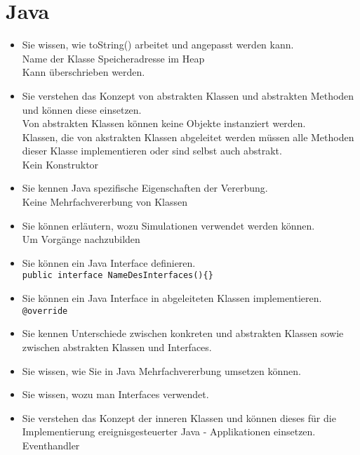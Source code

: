 \section{Java}
\begin{itemize}
  \item Sie wissen, wie toString() arbeitet und angepasst werden kann. \\
        Name der Klasse \@ Speicheradresse im Heap \\
        Kann überschrieben werden. 
  \item Sie verstehen das Konzept von abstrakten Klassen und abstrakten Methoden und können diese einsetzen. \\
        Von abstrakten Klassen können keine Objekte instanziert werden. \\
        Klassen, die von akstrakten Klassen abgeleitet werden müssen alle Methoden dieser Klasse implementieren oder sind selbst auch abstrakt. \\
        Kein Konstruktor
  \item Sie kennen Java spezifische Eigenschaften der Vererbung. \\
        Keine Mehrfachvererbung von Klassen
  \item Sie können erläutern, wozu Simulationen verwendet werden können. \\
        Um Vorgänge nachzubilden
  \item Sie können ein Java Interface definieren. \\
        \verb!public interface NameDesInterfaces(){}!
  \item Sie können ein Java Interface in abgeleiteten Klassen implementieren. \\
        \verb!@override!
  \item Sie kennen Unterschiede zwischen konkreten und abstrakten Klassen sowie zwischen abstrakten Klassen und Interfaces. \\
        
  \item Sie wissen, wie Sie in Java Mehrfachvererbung umsetzen können. \\
        
  \item Sie wissen, wozu man Interfaces verwendet. \\
        
  \item Sie verstehen das Konzept der inneren Klassen und können dieses für die Implementierung ereignisgesteuerter Java - Applikationen einsetzen. \\
        Eventhandler
\end{itemize}

